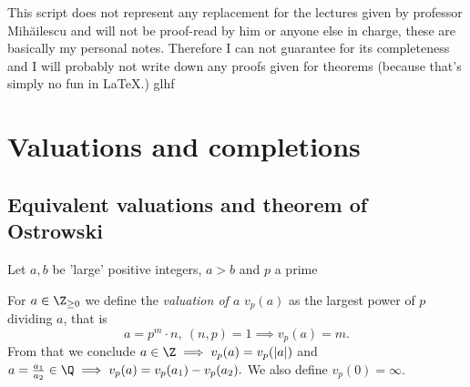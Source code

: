 \documentclass{jvfscript}
\begin{document}
	\frontmatter
	\maketitle
	
\tableofcontents
\newpage
\thispagestyle{plain}
This script does not represent any replacement for the lectures given by professor Mih\u{a}ilescu and will not be proof-read by him or anyone else in charge, these are basically my personal notes. Therefore I can not guarantee for its completeness and I will probably not write down any proofs given for theorems (because that's simply no fun in \LaTeX.)\hspace{\fill} glhf
\newpage
\mainmatter	
{}			%


\addtocounter{chapter}{2}
\chapter{Valuations and completions}

	\section{Equivalent valuations and theorem of Ostrowski}
		Let $a,b$ be 'large' positive integers, $a > b$ and $p$ a prime
	\begin{defn}[Valuation]
		For $a \in \Z_{\geq 0}$ we define the \emph{valuation of $a$} $v_p(a)$ as the largest power of $p$ dividing $a$, that is
		\[ a = p^m \cdot n,\ (n,p) = 1 \implies v_p(a) = m. \]
		From that we conclude $ a \in \Z \implies v_p(a) = v_p(|a|) $ and $ a = \frac{a_1}{a_2} \in \Q \implies v_p(a) = v_p(a_1) - v_p(a_2). $ We also define $ v_p(0) = \infty $.
	\end{defn}
	
\end{document}

